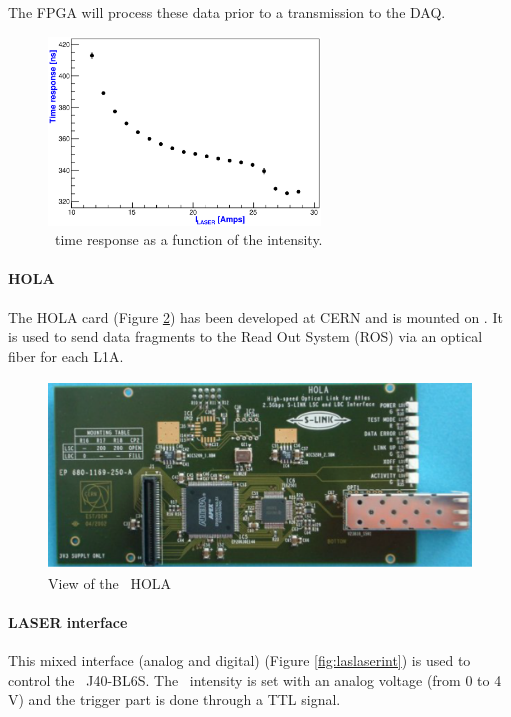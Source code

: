 The FPGA will process these data prior to  a transmission to the DAQ.

\begin{figure}[htbp]
\centering
\includegraphics[height=5cm]{figures/laser_timing_new.eps}
\caption{\las~time response as a function of the intensity.}\label{fig:lasresponse}
\end{figure}


\paragraph{HOLA}

The HOLA card \cite{ref:hola} (Figure \ref{fig:laslascarhola}) has been developed at CERN and is mounted on \lascar. It is used to send data fragments to the Read Out System (ROS) via an optical fiber for each L1A.
\begin{figure}[htbp]

\centering
\includegraphics[height=5cm]{figures/hola.pdf}
\caption{View of the \lascar~HOLA}\label{fig:laslascarhola}
\end{figure}

\paragraph{LASER interface}

This mixed interface (analog and digital) (Figure \ref{fig:laslaserint}) is used to control the \laser~J40-BL6S. The \laser~intensity is set with an analog voltage (from 0 to 4 V) and the trigger part is done through a TTL signal.

